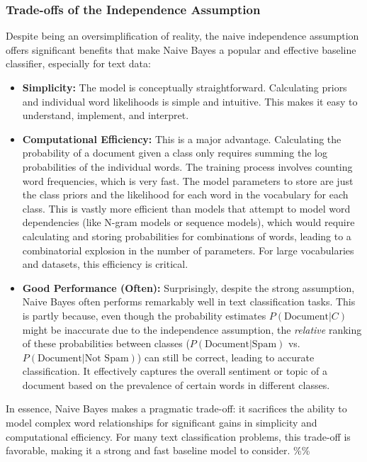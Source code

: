 \documentclass[12pt,a4paper]{article}
\begin{document}
\subsubsection{Trade-offs of the Independence Assumption}

Despite being an oversimplification of reality, the naive independence assumption offers significant benefits that make Naive Bayes a popular and effective baseline classifier, especially for text data:

\begin{itemize}
    \item \textbf{Simplicity:} The model is conceptually straightforward. Calculating priors and individual word likelihoods is simple and intuitive. This makes it easy to understand, implement, and interpret.
    \item \textbf{Computational Efficiency:} This is a major advantage. Calculating the probability of a document given a class only requires summing the log probabilities of the individual words. The training process involves counting word frequencies, which is very fast. The model parameters to store are just the class priors and the likelihood for each word in the vocabulary for each class. This is vastly more efficient than models that attempt to model word dependencies (like N-gram models or sequence models), which would require calculating and storing probabilities for combinations of words, leading to a combinatorial explosion in the number of parameters. For large vocabularies and datasets, this efficiency is critical.
    \item \textbf{Good Performance (Often):} Surprisingly, despite the strong assumption, Naive Bayes often performs remarkably well in text classification tasks. This is partly because, even though the probability estimates $P(\text{Document}|C)$ might be inaccurate due to the independence assumption, the \textit{relative} ranking of these probabilities between classes ($P(\text{Document}|\text{Spam})$ vs. $P(\text{Document}|\text{Not Spam})$) can still be correct, leading to accurate classification. It effectively captures the overall sentiment or topic of a document based on the prevalence of certain words in different classes.
\end{itemize}

In essence, Naive Bayes makes a pragmatic trade-off: it sacrifices the ability to model complex word relationships for significant gains in simplicity and computational efficiency. For many text classification problems, this trade-off is favorable, making it a strong and fast baseline model to consider.
\%\%
\end{document}
